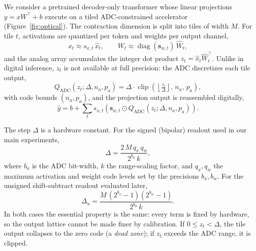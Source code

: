 \documentclass[letterpaper]{article} %
\theoremstyle{plain}
\begin{document}
We consider a pretrained decoder-only transformer whose linear projections $y = xW^{\top} + b$ execute on a tiled ADC-constrained accelerator (Figure~\ref{fig:optical}). The contraction dimension is split into tiles of width $M$. For tile $t$, activations are quantized per token and weights per output channel,
\begin{equation}
    x_t \approx s_{x,t}\,\hat{x}_t,
    \qquad
    W_t \approx \operatorname{diag}(\mathbf{s}_{w,t})\,\hat{W}_t,
    \label{eq:codes}
\end{equation}
and the analog array accumulates the integer dot product $z_t = \hat{x}_t \hat{W}_t^{\top}$. Unlike in digital inference, $z_t$ is not available at full precision: the ADC discretizes each tile output,
\begin{equation}
    Q_{\mathrm{ADC}}(z_t;\Delta,n_a,p_a)
    = \Delta\cdot\operatorname{clip}\!\left(\left\lfloor \tfrac{z_t}{\Delta} \right\rfloor,\, n_a,\, p_a\right),
    \label{eq:adc}
\end{equation}
with code bounds $(n_a,p_a)$, and the projection output is reassembled digitally,
\begin{equation}
    \hat{y} = b + \sum_t s_{x,t}\left(\mathbf{s}_{w,t} \odot Q_{\mathrm{ADC}}(z_t;\Delta,n_a,p_a)\right).
    \label{eq:dequant}
\end{equation}

The step $\Delta$ is a hardware constant. For the signed (bipolar) readout used in our main experiments,
\begin{equation}
    \Delta = \frac{2\,M\,q_x\,q_w}{2^{b_a}\,k},
    \label{eq:delta}
\end{equation}
where $b_a$ is the ADC bit-width, $k$ the range-scaling factor, and $q_x,q_w$ the maximum activation and weight code levels set by the precisions $b_x,b_w$. For the unsigned shift-subtract readout evaluated later,
\begin{equation}
    \Delta_u = \frac{M\,(2^{b_x}-1)(2^{b_w}-1)}{2^{b_a}\,k}.
    \label{eq:delta_u}
\end{equation}
In both cases the essential property is the same: every term is fixed by hardware, so the output lattice cannot be made finer by calibration. If $0 \le z_t < \Delta$, the tile output collapses to the zero code (a \emph{dead zone}); if $z_t$ exceeds the ADC range, it is clipped.
\end{document}
